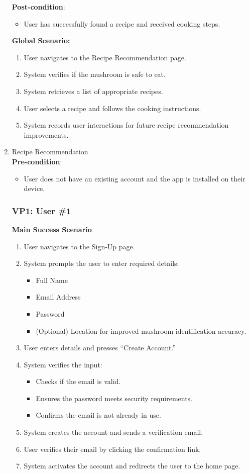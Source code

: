 \documentclass[]{article}
\begin{document}
\begin{enumerate}[{\bf BE1.}]
		\textbf{Post-condition}:  
		\begin{itemize}
			\item User has successfully found a recipe and received cooking steps.
		\end{itemize}
		
		\textbf{Global Scenario:}
		\begin{enumerate}
			\item User navigates to the Recipe Recommendation page.
			\item System verifies if the mushroom is safe to eat.
			\item System retrieves a list of appropriate recipes.
			\item User selects a recipe and follows the cooking instructions.
			\item System records user interactions for future recipe recommendation improvements.
		\end{enumerate}

	\item Recipe Recommendation \\

		\textbf{Pre-condition}:  
	\begin{itemize}
		\item User does not have an existing account and the app is installed on their device.  
	\end{itemize}

	\subsubsection*{VP1: User \#1}
	\textbf{Main Success Scenario}
	\begin{enumerate}
		\item User navigates to the Sign-Up page.
		\item System prompts the user to enter required details:
		\begin{itemize}
			\item Full Name
			\item Email Address
			\item Password
			\item (Optional) Location for improved mushroom identification accuracy.
		\end{itemize}
		\item User enters details and presses “Create Account.”
		\item System verifies the input:
		\begin{itemize}
			\item Checks if the email is valid.
			\item Ensures the password meets security requirements.
			\item Confirms the email is not already in use.
		\end{itemize}
		\item System creates the account and sends a verification email.
		\item User verifies their email by clicking the confirmation link.
		\item System activates the account and redirects the user to the home page.
	\end{enumerate}


\end{enumerate}
\end{document}
